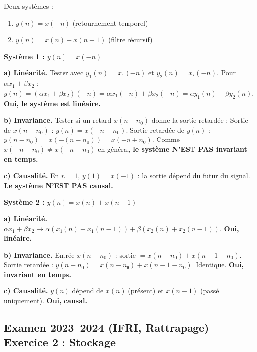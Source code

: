 \documentclass[12pt,a4paper]{article}
\begin{document}
\begin{tcolorbox}[corrbox, title=Correction Exercice 1 -- Vérification linéarité, invariance, causalité]
Deux systèmes :
\begin{enumerate}
  \item $y(n) = x(-n)$ \quad (retournement temporel)
  \item $y(n) = x(n) + x(n-1)$ \quad (filtre récursif)
\end{enumerate}

\bigskip
\textbf{Système 1 : $y(n) = x(-n)$}

\textbf{a) Linéarité.}
Tester avec $y_1(n) = x_1(-n)$ et $y_2(n) = x_2(-n)$.
Pour $\alpha x_1 + \beta x_2$ :
$y(n) = (\alpha x_1 + \beta x_2)(-n) = \alpha x_1(-n) + \beta x_2(-n) = \alpha y_1(n) + \beta y_2(n)$.
\textbf{Oui, le système est linéaire.}

\textbf{b) Invariance.} Tester si un retard $x(n-n_0)$ donne la sortie retardée :
Sortie de $x(n-n_0)$ : $y(n) = x(-n - n_0)$.
Sortie retardée de $y(n)$ : $y(n-n_0) = x(-(n-n_0)) = x(-n+n_0)$.
Comme $x(-n-n_0) \neq x(-n+n_0)$ en général,
\textbf{le système N'EST PAS invariant en temps.}

\textbf{c) Causalité.} En $n=1$, $y(1) = x(-1)$ : la sortie dépend du futur du signal.
\textbf{Le système N'EST PAS causal.}

\bigskip
\textbf{Système 2 : $y(n) = x(n) + x(n-1)$}

\textbf{a) Linéarité.}
$\alpha x_1 + \beta x_2 \to \alpha(x_1(n)+x_1(n-1)) + \beta(x_2(n)+x_2(n-1))$.
\textbf{Oui, linéaire.}

\textbf{b) Invariance.}
Entrée $x(n-n_0)$ : sortie $= x(n-n_0) + x(n-1-n_0)$.
Sortie retardée : $y(n-n_0) = x(n-n_0) + x(n-1-n_0)$.
Identique. \textbf{Oui, invariant en temps.}

\textbf{c) Causalité.}
$y(n)$ dépend de $x(n)$ (présent) et $x(n-1)$ (passé uniquement).
\textbf{Oui, causal.}
\end{tcolorbox}

\subsection{Examen 2023--2024 (IFRI, Rattrapage) -- Exercice 2 : Stockage}
\end{document}
